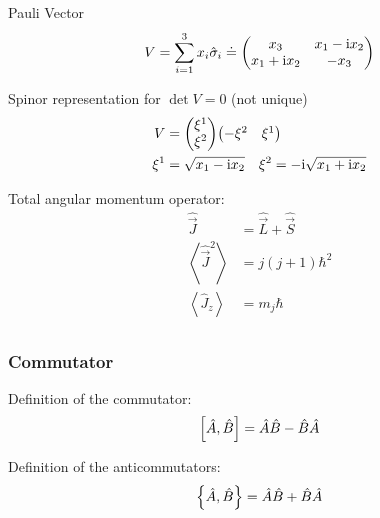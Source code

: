 		\noindent
		Pauli Vector
		\begin{equation}
			V
			= \sum_{i=1}^3 x_i \hat{\sigma}_i
			\doteq \left( \begin{matrix}
				x_3 & x_1 - \mathrm{i} x_2 \\
				x_1 + \mathrm{i} x_2 & - x_3 \\
			\end{matrix} \right)							
		\end{equation}

		\noindent
		Spinor representation for $\det V = 0$ (not unique)
		\begin{equation}
			\begin{aligned}
				V &= \vecc{\xi^1}{\xi^2} \veccT{-\xi^2}{\xi^1} \\
				\xi^1 &= \sqrt{x_1 - \i x_2} \quad \xi^2 = -\i \sqrt{x_1 + \i x_2} \\					
			\end{aligned}
		\end{equation}


		\noindent
		Total angular momentum operator:
		\begin{equation}
			\begin{aligned}
				\hat{\vec{J}} &= \hat{\vec{L}} + \hat{\vec{S}} \\
				\left< \hat{\vec{J}}^2 \right> &= j(j+1)\hbar^2 \\
				\left< \hat{J}_z \right> &= m_j\hbar \\
			\end{aligned}
		\end{equation}

		\subsubsection{Commutator}
			\noindent
			Definition of the commutator:
			\begin{equation}
				\comm{\hat{A}}{\hat{B}} = \hat{A}\hat{B} - \hat{B}\hat{A}
			\end{equation}

			\noindent
			Definition of the anticommutators:
			\begin{equation}
				\acomm{\hat{A}}{\hat{B}} = \hat{A}\hat{B} + \hat{B}\hat{A}
			\end{equation}


